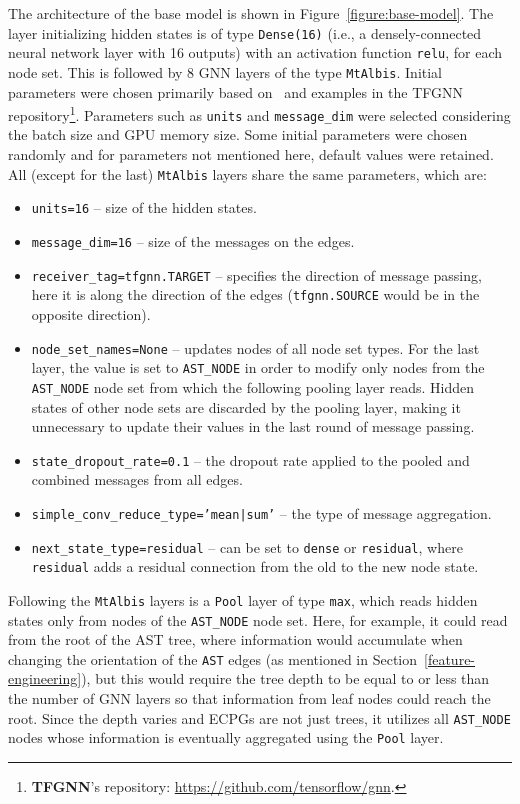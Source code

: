 The architecture of the base model is shown in Figure~\ref{figure:base-model}. The layer initializing hidden states is of type \texttt{Dense(16)} (i.e., a densely-connected neural network layer with 16 outputs) with an activation function \texttt{relu}, for each node set. This is followed by 8 GNN layers of the type \texttt{MtAlbis}. Initial parameters were chosen primarily based on~\cite{tfgnn-mtalbis} and examples in the TFGNN repository\footnote{\textbf{TFGNN}'s repository: \url{https://github.com/tensorflow/gnn}.}. Parameters such as \texttt{units} and \texttt{message\_dim} were selected considering the batch size and GPU memory size. Some initial parameters were chosen randomly and for parameters not mentioned here, default values were retained. All (except for the last) \texttt{MtAlbis} layers share the same parameters, which are:
\begin{itemize}
    \item \texttt{units=16} -- size of the hidden states.
    \item \texttt{message\_dim=16} -- size of the messages on the edges.
    \item \texttt{receiver\_tag=tfgnn.TARGET} -- specifies the direction of message passing, here it is along the direction of the edges (\texttt{tfgnn.SOURCE} would be in the opposite direction).
    \item \texttt{node\_set\_names=None} -- updates nodes of all node set types. For the last layer, the value is set to \texttt{AST\_NODE} in order to modify only nodes from the \texttt{AST\_NODE} node set from which the following pooling layer reads. Hidden states of other node sets are discarded by the pooling layer, making it unnecessary to update their values in the last round of message passing.
    \item \texttt{state\_dropout\_rate=0.1} -- the dropout rate applied to the pooled and combined messages from all edges.
    \item \texttt{simple\_conv\_reduce\_type='mean|sum'} -- the type of message aggregation.
    \item \texttt{next\_state\_type=residual} -- can be set to \texttt{dense} or \texttt{residual}, where \texttt{residual} adds a residual connection from the old to the new node state.
\end{itemize}

Following the \texttt{MtAlbis} layers is a \texttt{Pool} layer of type \texttt{max}, which reads hidden states only from nodes of the \texttt{AST\_NODE} node set. Here, for example, it could read from the root of the AST tree, where information would accumulate when changing the orientation of the \texttt{AST} edges (as mentioned in Section~\ref{feature-engineering}), but this would require the tree depth to be equal to or less than the number of GNN layers so that information from leaf nodes could reach the root. Since the depth varies and ECPGs are not just trees, it utilizes all \texttt{AST\_NODE} nodes whose information is eventually aggregated using the \texttt{Pool} layer.

